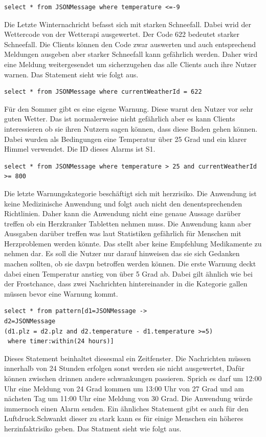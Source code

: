 \begin{lstlisting}
select * from JSONMessage where temperature <=-9
\end{lstlisting}
Die Letzte Winternachricht befasst sich mit starken Schneefall. Dabei wrid der Wettercode von der Wetterapi ausgewertet. Der Code 622 bedeutet starker Schneefall. Die Clients können den Code zwar auswerten und auch entsprechend Meldungen ausgeben aber starker Schneefall kann gefährlich werden. Daher wird eine Meldung weitergesendet um sicherzugehen das alle Clients auch ihre Nutzer warnen. Das Statement sieht wie folgt aus. 
\begin{lstlisting}
select * from JSONMessage where currentWeatherId = 622
\end{lstlisting}  
Für den Sommer gibt es eine eigene Warnung. Diese warnt den Nutzer vor sehr guten Wetter. Das ist normalerweise nicht gefährlich aber es kann Clients interessieren ob sie ihren Nutzern sagen können, dass diese Baden gehen können. Dabei wurden als Bedingungen eine Temperatur über 25 Grad und ein klarer Himmel verwendet. Die ID dieses Alarms ist S1. 
\begin{lstlisting}
select * from JSONMessage where temperature > 25 and currentWeatherId >= 800
\end{lstlisting}
Die letzte Warnungskategorie beschäftigt sich mit herzrisiko. Die Anwendung ist keine Medizinische Anwendung und folgt auch nicht den denentsprechenden Richtlinien. Daher kann die Anwendung nicht eine genaue Aussage darüber treffen ob ein Herzkranker Tabletten nehmen muss. Die Anwendung kann aber Aussgaben darüber treffen was laut Statistiken gefährlich für Menschen mit Herzproblemen werden könnte. Das stellt aber keine Empfehlung Medikamente zu nehmen dar. Es soll die Nutzer nur darauf hinweisen das sie sich Gedanken machen sollten, ob sie davpn betroffen werden können. Die erste Warnung deckt dabei einen Temperatur anstieg von über 5 Grad ab. Dabei gilt ähnlich wie bei der Frostchance, dass zwei Nachrichten hintereinander in die Kategorie gallen müssen bevor eine Warnung kommt. 
\begin{lstlisting}
select * from pattern[d1=JSONMessage ->
d2=JSONMessage
(d1.plz = d2.plz and d2.temperature - d1.temperature >=5)
 where timer:within(24 hours)]
\end{lstlisting} 
Dieses Statement beinhaltet diesesmal ein Zeitfenster. Die Nachrichten müssen innerhalb von 24 Stunden erfolgen sonst werden sie nicht ausgewertet, Dafür können zwischen drinnen andere schwankungen passieren. Sprich es darf um 12:00 Uhr eine Meldung von 24 Grad kommen um 13:00 Uhr von 27 Grad und am nächsten Tag um 11:00 Uhr eine Meldung von 30 Grad. Die Anwendung würde immernoch einen Alarm senden. Ein ähnliches Statement gibt es auch für den Luftdruck.Schwankt dieser zu stark kann es für einige Menschen ein höheres herzinfaktrisiko geben.  Das Statment sieht wie folgt aus.

